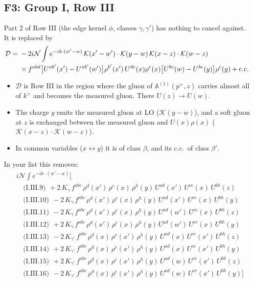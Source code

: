 \documentclass[10pt]{article}
\numberwithin{equation}{section}
\newcommand{\KK}{\mathcal K}
\newcommand{\NN}{\mathcal N}
\begin{document}
\subsection{F3: Group I, Row III}\label{sec:F3}
Part 2 of Row III (the edge kernel $\phi$, classes $\gamma,\gamma'$) has nothing to cancel against. It is replaced by
\begin{align}
\mathcal D={}&-2i\NN\int e^{-ik\cdot(w'-w)}\,\KK(x'-w')\cdot\KK(y-w)\,\KK(x-z)\cdot\KK(w-z)\notag\\
&\times f^{abd}\big[U^{ab'}(x')-U^{ab'}(w')\big]\rho^{b'}(x')\,U^{de}(x)\rho^e(x)\big[U^{bc}(w)-U^{bc}(y)\big]\rho^c(y)+{\rm c.c.}
\end{align}
\begin{itemize}
\item $\mathcal D$ is Row III in the region where the gluon of $\mathbb A^{(1)}(p^+,z)$ carries almost all of $k^+$ and becomes the measured gluon. There $U(z)\to U(w)$.
\item The charge $y$ emits the measured gluon at LO ($\KK(y-w)$), and a soft gluon at $z$ is exchanged between the measured gluon and $U(x)\rho(x)$ ($\KK(x-z)\cdot\KK(w-z)$).
\item In common variables ($x\leftrightarrow y$) it is of class $\beta$, and its c.c.\ of class $\beta'$.
\end{itemize}
In your list this removes:
\begin{align*}
&i\NN\int e^{-ik\cdot(w'-w)}\Big[\\
&\quad\text{(I.III.9)}\ \ +2\,K_{\gamma}\,f^{abc}\,\rho^{d}(x')\,\rho^{e}(x)\,\rho^{h}(y)\,U^{ad}(x')\,U^{ce}(x)\,U^{bh}(z)\\
&\quad\text{(I.III.10)}\ \ -2\,K_{\gamma}\,f^{abc}\,\rho^{d}(x')\,\rho^{e}(x)\,\rho^{h}(y)\,U^{ad}(x')\,U^{ce}(x)\,U^{bh}(y)\\
&\quad\text{(I.III.11)}\ \ -2\,K_{\gamma}\,f^{abc}\,\rho^{d}(x')\,\rho^{e}(x)\,\rho^{h}(y)\,U^{ad}(w')\,U^{ce}(x)\,U^{bh}(z)\\
&\quad\text{(I.III.12)}\ \ +2\,K_{\gamma}\,f^{abc}\,\rho^{d}(x')\,\rho^{e}(x)\,\rho^{h}(y)\,U^{ad}(w')\,U^{ce}(x)\,U^{bh}(y)\\
&\quad\text{(I.III.13)}\ \ -2\,K_{\gamma'}\,f^{abc}\,\rho^{d}(x)\,\rho^{e}(x')\,\rho^{h}(y)\,U^{ad}(x)\,U^{ce}(x')\,U^{bh}(z)\\
&\quad\text{(I.III.14)}\ \ +2\,K_{\gamma'}\,f^{abc}\,\rho^{d}(x)\,\rho^{e}(x')\,\rho^{h}(y)\,U^{ad}(x)\,U^{ce}(x')\,U^{bh}(y)\\
&\quad\text{(I.III.15)}\ \ +2\,K_{\gamma'}\,f^{abc}\,\rho^{d}(x)\,\rho^{e}(x')\,\rho^{h}(y)\,U^{ad}(w)\,U^{ce}(x')\,U^{bh}(z)\\
&\quad\text{(I.III.16)}\ \ -2\,K_{\gamma'}\,f^{abc}\,\rho^{d}(x)\,\rho^{e}(x')\,\rho^{h}(y)\,U^{ad}(w)\,U^{ce}(x')\,U^{bh}(y)\Big]
\end{align*}
\end{document}
